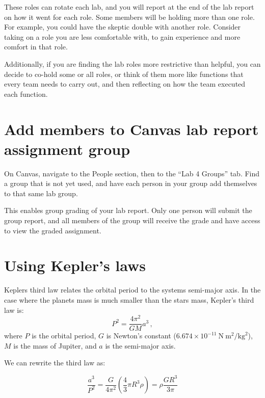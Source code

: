 These roles can rotate each lab, and you will report at the end of the lab report on how it went for each role. Some members will be holding more than one role. For example, you could have the skeptic double with another role. Consider taking on a role you are less comfortable with, to gain experience and more comfort in that role.

Additionally, if you are finding the lab roles more restrictive than helpful, you can decide to co-hold some or all roles, or think of them more like functions that every team needs to carry out, and then reflecting on how the team executed each function.

\section{Add members to Canvas lab report assignment group}

\begin{steps}
	\item On Canvas, navigate to the People section, then to the ``Lab 4 Groups'' tab. Find a group that is not yet used, and have each person in your group add themselves to that same lab group.
\end{steps}

This enables group grading of your lab report. Only one person will submit the group report, and all members of the group will receive the grade and have access to view the graded assignment.

\section{Using Kepler's laws}

Keplers third law relates the orbital period to the systems semi-major axis. In the case where the planets mass is much smaller than the stars mass, Kepler's third law is:
\begin{equation}
P^2 = \frac{4\pi^2}{G M}a^3 \,,
\end{equation}
where $P$ is the orbital period, $G$ is Newton's constant ($6.674 \times 10^{-11}\:\textrm{N}\:\textrm{m}^2/\textrm{kg}^2$), $M$ is the mass of Jupiter, and $a$ is the semi-major axis.

We can rewrite the third law as:

\begin{equation}
\frac{a^3}{P^2} = \frac{G}{4\pi^2}\left(\frac{4}{3}\pi R^3\rho \right) = \rho\frac{G R^3}{3\pi}
\end{equation}

